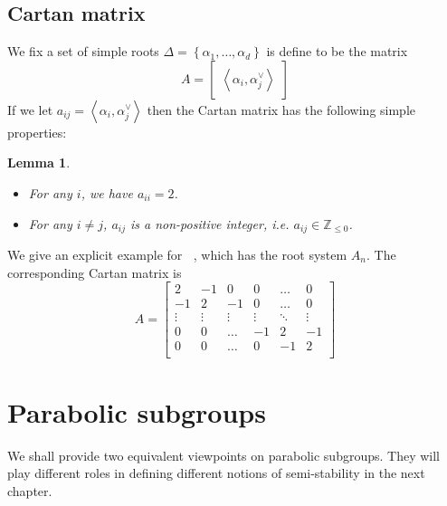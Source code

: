 \documentclass[12pt]{article} %
\newtheorem{lemma}[definition]{Lemma}
\DeclareMathOperator{\slnr}{\mathfrak{sl}_n(\mathbb{R})}
\begin{document}
\subsection{Cartan matrix}
We fix a set of simple roots $\Delta = \left\lbrace \alpha_1,\ldots,\alpha_d \right\rbrace$ is define to be the matrix
\[A = \begin{bmatrix} \left\langle \alpha_i,\alpha_j^\vee  \right\rangle
    \end{bmatrix}\]
If we let $a_{ij}=  \left\langle \alpha_i,\alpha_j^\vee\right\rangle$ then the Cartan matrix has the following simple properties:
\begin{lemma}
    \hfill
    \begin{itemize}
        \item For any $i$, we have $a_{ii}=2$.
        \item For any $i \ne j$, $a_{ij}$ is a non-positive integer, i.e. $a_{ij} \in \mathbb{Z}_{\le 0}$.
    \end{itemize}
\end{lemma}
We give an explicit example for $\slnr$, which has the root system $A_n$. The corresponding Cartan matrix is
\[A = \begin{bmatrix}
        2      & -1     & 0      & 0      & \ldots & 0      \\
        -1     & 2      & -1     & 0      & \ldots & 0      \\
        \vdots & \vdots & \vdots & \vdots & \ddots & \vdots \\
        0      & 0      & \ldots & -1     & 2      & -1     \\
        0      & 0      & \ldots & 0     & -1      & 2     \\
    \end{bmatrix}\]
\section{Parabolic subgroups}
We shall provide two equivalent viewpoints on parabolic subgroups. They will play different roles in defining 
different notions of semi-stability in the next chapter. 
\end{document}
